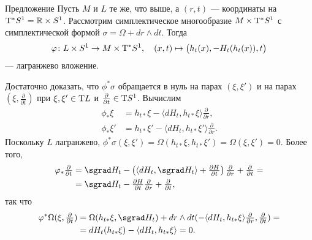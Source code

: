 \begin{thm*}{Предложение}
Пусть $M$ и $L$ те же, что выше, а $(r, t)$ — координаты на $\mathrm{T}^\ast S^1 = \mathbb{R} \times S^1$.
Рассмотрим симплектическое многообразие $M \times \mathrm{T}^\ast S^1$ с симплектической формой $\sigma = \Omega + dr \wedge dt$.
Тогда
\[\varphi\colon L \times S^1 \to M \times \mathrm{T}^\ast S^1,
\quad
(x, t) \mapsto \big(h_t (x), -H_{t} (h_t (x)), t\big)\]
— лагранжево вложение.
\end{thm*}

Достаточно доказать, что $\phi^\ast \sigma$ обращается в нуль на парах $(\xi, \xi')$ и на парах  $(\xi, \tfrac{\partial}{\partial t})$ при $\xi, \xi' \in \mathrm{T} L$ и $\tfrac{\partial}{\partial t} \in \mathrm{T} S^1$.
Вычислим 
\begin{align*}
\phi_\ast \xi
&= h_{t\ast} \xi - \langle dH_t, h_{t\ast} \xi\rangle
\tfrac{\partial}{\partial r},
\\
\phi_\ast \xi'
&= h_{t\ast} \xi' - \langle dH_t, h_{t\ast} \xi'\rangle
\tfrac{\partial}{\partial r}.
\end{align*}
Поскольку $L$ лагранжево, $\phi^\ast \sigma (\xi, \xi') = \Omega (h_{t\ast} \xi, h_{t\ast} \xi') = \Omega (\xi, \xi') = 0$.
Более того,
\begin{align*}
\phi_\ast\tfrac{\partial}{\partial t}
&= \sgrad H_t - 
\left( \langle dH_t, \sgrad H_t \rangle +\tfrac{\partial H}{\partial t}\right) \tfrac{\partial}{\partial r} +\tfrac{\partial}{\partial t}=
\\
&=\sgrad H_t - \tfrac{\partial H}{\partial t}\tfrac{\partial}{\partial r} +\tfrac{\partial}{\partial t},
\end{align*}
так что
\begin{align*}
\phi^\ast \Omega (\xi, \tfrac{\partial}{\partial t})
&= \Omega (h_{t\ast} \xi, \sgrad H_t) + dr \wedge dt (-\langle dH_t, h_{t\ast} \xi\rangle \tfrac{\partial}{\partial r},\tfrac{\partial}{\partial t}) =
\\
&=dH_t (h_{t\ast} \xi) - \langle dH_t, h_{t\ast} \xi\rangle = 0.
\end{align*}
\qedsf

